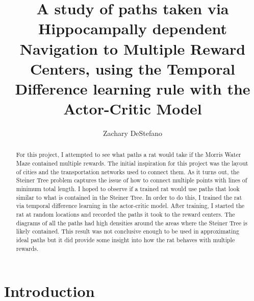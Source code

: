 \documentclass[conference]{IEEEtran}
\begin{document}
\title{A study of paths taken via Hippocampally dependent Navigation to Multiple Reward Centers, using the Temporal Difference learning rule with the Actor-Critic Model}


\author{Zachary DeStefano}

\maketitle


\begin{abstract}
For this project, I attempted to see what paths a rat would take if the Morris Water Maze contained multiple rewards. The initial inspiration for this project was the layout of cities and the transportation networks used to connect them. As it turns out, the Steiner Tree problem captures the issue of how to connect multiple points with lines of minimum total length. I hoped to observe if a trained rat would use paths that look similar to what is contained in the Steiner Tree. In order to do this, I trained the rat via temporal difference learning in the actor-critic model. After training, I started the rat at random locations and recorded the paths it took to the reward centers. The diagrams of all the paths had high densities around the areas where the Steiner Tree is likely contained. This result was not conclusive enough to be used in approximating ideal paths but it did provide some insight into how the rat behaves with multiple rewards. 
\end{abstract}

\IEEEpeerreviewmaketitle



\section{Introduction}
\end{document}
